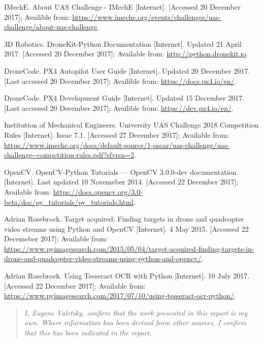 \documentclass[11pt]{article}
\begin{document}
{\small
\begin{thebibliography}{11}

        IMechE. About UAS Challenge - IMechE [Internet]. [Accessed 20 December 2017]; Availible from: \url{https://www.imeche.org/events/challenges/uas-challenge/about-uas-challenge}.

        3D Robotics. DroneKit-Python Documentation [Internet]. Updated 21 April 2017. [Accessed 20 December 2017]; Available from: \url{http://python.dronekit.io}.

        DroneCode. PX4 Autopilot User Guide [Internet]. Updated 20 December 2017. [Last accessed 20 December 2017]; Availible from: \url{https://docs.px4.io/en/}.

        DroneCode. PX4 Development Guide [Internet]. Updated 15 December 2017. [Last accessed 20 December 2017]; Availible from: \url{https://dev.px4.io/en/}.

        Institution of Mechanical Engineers. University UAS Challenge 2018 Competition Rules [Internet]. Issue 7.1. [Accessed 27 December 2017]; Available from: \url{https://www.imeche.org/docs/default-source/1-oscar/uas-challenge/uas-challenge--competition-rules.pdf?sfvrsn=2}.

        OpenCV. OpenCV-Python Tutorials — OpenCV 3.0.0-dev documentation [Internet]. Last updated 10 Novemeber 2014. [Accessed 22 December 2017]; Available from: \url{https://docs.opencv.org/3.0-beta/doc/py_tutorials/py_tutorials.html}.

        Adrian Rosebrock. Target acquired: Finding targets in drone and quadcopter video streams using Python and OpenCV [Internet]. 4 May 2015. [Accessed 22 Decemeber 2017]; Available from: \url{https://www.pyimagesearch.com/2015/05/04/target-acquired-finding-targets-in-drone-and-quadcopter-video-streams-using-python-and-opencv/}.

        Adrian Rosebrock. Using Tesseract OCR with Python [Internet]. 10 July 2017. [Accessed 22 December 2017]; Available from: \url{https://www.pyimagesearch.com/2017/07/10/using-tesseract-ocr-python/}.

\end{thebibliography}}

\begin{quote}
    \emph{I, Eugene Valetsky, confirm that the work presented in this report is my own. Where information has been derived from other sources, I confirm that this has been indicated in the report.}
\end{quote}
\end{document}
